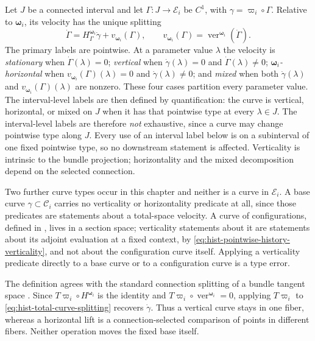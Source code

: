 Let $J$ be a connected interval and let
$\Gamma:J\to\mathcal E_i$ be $C^1$, with
$\gamma=\varpi_i\circ\Gamma$.  Relative to
$\boldsymbol\omega_i$, its velocity has the unique splitting
\begin{equation}
\dot\Gamma
=H^{\boldsymbol\omega_i}_{\Gamma}\dot\gamma
+v_{\boldsymbol\omega_i}(\Gamma),
\qquad
v_{\boldsymbol\omega_i}(\Gamma)
=\operatorname{ver}^{\boldsymbol\omega_i}(\dot\Gamma).
\label{eq:hist-total-curve-splitting}
\end{equation}
The primary labels are pointwise.  At a parameter value $\lambda$ the velocity
is \emph{stationary} when $\dot\Gamma(\lambda)=0$; \emph{vertical} when
$\dot\gamma(\lambda)=0$ and $\dot\Gamma(\lambda)\ne0$;
\emph{$\boldsymbol\omega_i$-horizontal} when
$v_{\boldsymbol\omega_i}(\Gamma)(\lambda)=0$ and $\dot\gamma(\lambda)\ne0$; and
\emph{mixed} when both $\dot\gamma(\lambda)$ and
$v_{\boldsymbol\omega_i}(\Gamma)(\lambda)$ are nonzero.  These four cases
partition every parameter value.  The interval-level labels are then defined by
quantification: the curve is vertical, horizontal, or mixed on $J$ when it has
that pointwise type at every $\lambda\in J$.  The interval-level labels are
therefore \emph{not} exhaustive, since a curve may change pointwise type along
$J$.  Every use of an interval label below is on a subinterval of one fixed
pointwise type, so no downstream statement is affected.  Verticality is
intrinsic to the bundle projection; horizontality and the mixed decomposition
depend on the selected connection.  

Two further curve types occur in this chapter and neither is a curve in
$\mathcal E_i$.  A base curve $\gamma\subset\mathcal C_i$ carries no
verticality or horizontality predicate at all, since those predicates are
statements about a total-space velocity.  A curve of configurations, defined in
, lives in a section space; verticality
statements about it are statements about its adjoint evaluation at a fixed
context, by \eqref{eq:hist-pointwise-history-verticality}, and not about the
configuration curve itself.  Applying a verticality predicate directly to a
base curve or to a configuration curve is a type error.

The definition agrees with the standard connection splitting of a bundle
tangent space \citep{Kobayashi1963}.  Since
$T\varpi_i\circ H^{\boldsymbol\omega_i}$ is the identity and
$T\varpi_i\circ\operatorname{ver}^{\boldsymbol\omega_i}=0$, applying
$T\varpi_i$ to \eqref{eq:hist-total-curve-splitting} recovers
$\dot\gamma$.  Thus a vertical curve stays in one fiber, whereas a
horizontal lift is a connection-selected comparison of points in different
fibers.  Neither operation moves the fixed base itself.

